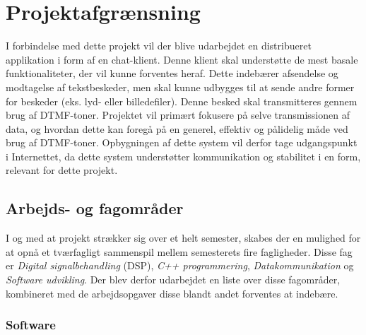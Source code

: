 \section{Projektafgrænsning}
I forbindelse med dette projekt vil der blive udarbejdet en distribueret applikation i form af en chat-klient. Denne klient skal understøtte de mest basale funktionaliteter, der vil kunne forventes heraf. Dette indebærer afsendelse og modtagelse af tekstbeskeder, men skal kunne udbygges til at sende andre former for beskeder (eks. lyd- eller billedefiler). Denne besked skal transmitteres gennem brug af DTMF-toner. 
Projektet vil primært fokusere på selve transmissionen af data, og hvordan dette kan foregå på en generel, effektiv og pålidelig måde ved brug af DTMF-toner. Opbygningen af dette system vil derfor tage udgangspunkt i Internettet, da dette system understøtter kommunikation og stabilitet i en form, relevant for dette projekt. 



\subsection{Arbejds- og fagområder}

I og med at projekt strækker sig over et helt semester, skabes der en mulighed for at opnå et tværfagligt sammenspil mellem semesterets fire fagligheder. Disse fag er \textit{Digital signalbehandling} (DSP), \textit{ C++ programmering}, \textit{Datakommunikation} og \textit{Software udvikling}. Der blev derfor udarbejdet en liste over disse fagområder, kombineret med de arbejdsopgaver disse blandt andet forventes at indebære.   


\subsubsection{Software}

